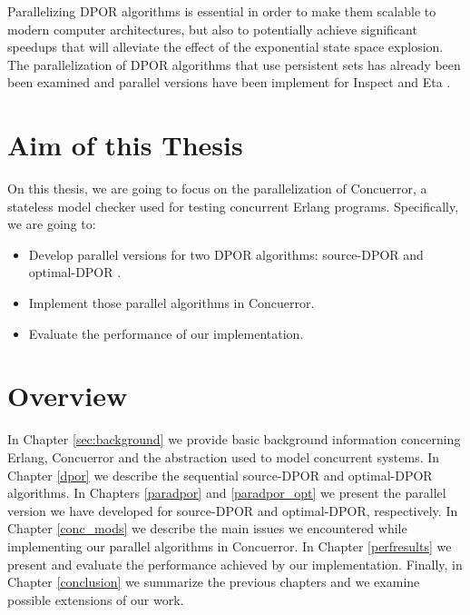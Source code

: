 Parallelizing DPOR algorithms is essential in order to make them scalable to modern computer architectures, but also to potentially 
achieve significant speedups that will alleviate the effect of the exponential state space explosion. The parallelization of
DPOR algorithms that use persistent sets \cite{FlanaganDPOR, Lei:2006:RTC:1248722.1248743, 10.1007/3-540-53863-1_36} has already been 
been examined and parallel versions have been implement for Inspect \cite{yang2008inspect} and Eta 
\cite{Simsa2012ScalableDP}.

\section{Aim of this Thesis}

On this thesis, we are going to focus on the parallelization of Concuerror, a stateless model checker
used for testing concurrent Erlang programs. Specifically, we are going to: 

\begin{itemize}
\item Develop parallel versions for two DPOR algorithms: source-DPOR \cite{AbdullaAronisJohnssonSagonasDPOR2014} and optimal-DPOR \cite{AbdullaAronisJohnssonSagonasDPOR2014}.
\item Implement those parallel algorithms in Concuerror.
\item Evaluate the performance of our implementation.

\end{itemize}

\section{Overview}

In Chapter \ref{sec:background} we provide basic background information concerning Erlang, Concuerror and the abstraction used to model concurrent systems. In Chapter \ref{dpor} we describe the sequential source-DPOR and optimal-DPOR algorithms. In Chapters \ref{paradpor} and \ref{paradpor_opt} we present the parallel version we have developed for source-DPOR and optimal-DPOR, respectively. In Chapter 
\ref{conc_mods} we describe the main issues we encountered while implementing our parallel algorithms in Concuerror. In Chapter 
\ref{perfresults} we present and evaluate the performance achieved by our implementation. Finally, in Chapter \ref{conclusion}
we summarize the previous chapters and we examine possible extensions of our work.
